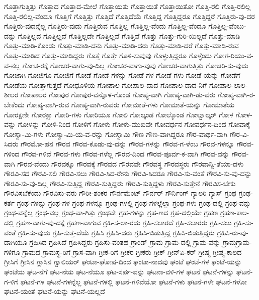 {ಗೊತ್ತಾಗುತ್ತಿತ್ತು
ಗೊತ್ತಾದ
ಗೊತ್ತಾದ-ಮೇಲೆ
ಗೊತ್ತಾಯಿತು
ಗೊತ್ತಾಯಿತೆ
ಗೊತ್ತಾಯಿತೋ
ಗೊತ್ತಿ-ರಲಿ
ಗೊತ್ತಿ-ರಲಿಲ್ಲ
ಗೊತ್ತಿ-ರಲಿಲ್ಲ-ವೆಂದೂ
ಗೊತ್ತಿಗೆ
ಗೊತ್ತಿತ್ತು
ಗೊತ್ತಿದೆ
ಗೊತ್ತಿದೆಯೆ
ಗೊತ್ತಿದ್ದ
ಗೊತ್ತಿದ್ದರೂ
ಗೊತ್ತಿದ್ದರೆ
ಗೊತ್ತಿರು-ವು-ದರ
ಗೊತ್ತಿರು-ವುದನ್ನೆಲ್ಲ
ಗೊತ್ತಿರು-ವುದು
ಗೊತ್ತಿರುವ
ಗೊತ್ತಿಲ್ಲ
ಗೊತ್ತಿಲ್ಲ-ವೆಂದು
ಗೊತ್ತಿಲ್ಲ-ವೆಂದೂ
ಗೊತ್ತಿಲ್ಲ-ವೆಂಬು-ದನ್ನು
ಗೊತ್ತಿಲ್ಲದ
ಗೊತ್ತಿಲ್ಲದೆ
ಗೊತ್ತಿಲ್ಲದೇ
ಗೊತ್ತಿಲ್ಲವೆ
ಗೊತ್ತಿವೆ
ಗೊತ್ತು
ಗೊತ್ತು-ಗುರಿ-ಯಿಲ್ಲದೆ
ಗೊತ್ತು-ಮಾಡಿ
ಗೊತ್ತು-ಮಾಡಿ-ಕೊಂಡು
ಗೊತ್ತು-ಮಾಡಿ-ದನು
ಗೊತ್ತು-ಮಾಡಿ-ದರು
ಗೊತ್ತು-ಮಾಡಿ-ದರೆ
ಗೊತ್ತು-ಮಾಡಿ-ರುವ
ಗೊತ್ತು-ಮಾಡಿದ
ಗೊತ್ತು-ಮಾಡಿದ್ದರು
ಗೊತ್ತೆ
ಗೊತ್ತೇ
ಗೊಳಿ-ಸುವುವು
ಗೊಳ್ಳುತ್ತಿದ್ದರೂ
ಗೊಳ್ಳೆಂದು
ಗೋಗ-ರಿಯು-ವ-ವ-ನಲ್ಲ
ಗೋಚ-ರಕ್ಕೆ
ಗೋಚರ-ವಾಗು-ವು-ದಿಲ್ಲ
ಗೋಚರ-ವಾಗು-ವುವು
ಗೋಚರ-ವಾಗುತ್ತಿತ್ತು
ಗೋಚರಿ-ಸು-ವುದು
ಗೋಜಾಗಿ
ಗೋಜಿಗೂ
ಗೋಜಿಗೆ
ಗೋಡೆ
ಗೋಡೆ-ಗಳನ್ನು
ಗೋಡೆ-ಗಳ
ಗೋಡೆ-ಗಳು
ಗೋಡೆ-ಯನ್ನು
ಗೋಡೆಗೆ
ಗೋಡೆಯ
ಗೋತ್ತಾಗುತ್ತದೆ
ಗೋಧೂಳಿಯ
ಗೋಪಾಲ
ಗೋಪಾಲ-ದಾದ
ಗೋಪಾಲ-ದಾದ-ನಿಗೆ
ಗೋಪಾಲ-ಲಾಲ-ಶೀಲರ
ಗೋಪಾಲರ
ಗೋಪುರ
ಗೋಪುರ-ವನ್ನೊಳ-ಗೊಂಡ
ಗೋಪ್ಯ-ವಾಗಿ
ಗೋಪ್ಯ-ವಾಗಿ-ಡು-ವರು
ಗೋಪ್ಯ-ವಾಗಿ-ರ-ಬೇಕೆಂದು
ಗೋಪ್ಯ-ವಾಗಿ-ರುವ
ಗೋಪ್ಯ-ವಾಗಿ-ರುವರು
ಗೋಮಾತೆ-ಗಳು
ಗೋಮಾತೆ-ಯನ್ನು
ಗೋಮಾತೆಯ
ಗೋರಕ್ಷಣೀ
ಗೋರಕ್ಷಾ
ಗೋರಿ-ಗಳು
ಗೋರಿಯೂ
ಗೋಲಿ
ಗೋಲ್ಕಂಡ
ಗೋಲ್ಕೊಂಡ
ಗೋಲ್ವಾಲ್ಕರ್
ಗೋಳ
ಗೋಳ-ವನ್ನು
ಗೋಳನ್ನು
ಗೋಳಿ-ನಿಂದ
ಗೋಳಿಗೆ
ಗೋಳು
ಗೋಳು-ಮುಖವೇ
ಗೋವರ್ಧನ
ಗೋವರ್ಧನ-ದಿಂದ
ಗೋವಾಕ್ಕೆ
ಗೋಸ್ವಾ-ಮಿ-ಗಳು
ಗೋಸ್ವಾ-ಮಿ-ಯ-ವ-ರನ್ನು
ಗೋಸ್ವಾಮಿ
ಗೌಣ
ಗೌಣ-ವಾಗಿದ್ದರೂ
ಗೌರ-ವಾರ್ಥ-ವಾಗಿ
ಗೌರ-ವಿ-ಸಿದರು
ಗೌರಮೋ-ಹನ
ಗೌರವ
ಗೌರವ-ಕೊಡು-ವು-ದನ್ನು
ಗೌರವ-ಗಳನ್ನು
ಗೌರವ-ಗ-ಳೆಂಬ
ಗೌರವ-ಗಳನ್ನೂ
ಗೌರವ-ಗಳಿಂದ
ಗೌರವ-ಗಳಿವೆ
ಗೌರವ-ಗಳು
ಗೌರವ-ಗಳೆಲ್ಲ
ಗೌರವ-ದಿಂದ
ಗೌರವ-ಪೂರ್ವ-ಕ-ವಾಗಿ
ಗೌರವ-ವನ್ನು
ಗೌರವ-ವಾಗಿ
ಗೌರವ-ವೆಂದು
ಗೌರವಕ್ಕೂ
ಗೌರವಕ್ಕೆ
ಗೌರವದ
ಗೌರವವೇ
ಗೌರವಸ್ಥ
ಗೌರವಸ್ಥರು
ಗೌರವಾನ್ವಿ-ತೆಯಾ-ದಳು
ಗೌರವಿ-ಸದ
ಗೌರವಿ-ಸಲಿ
ಗೌರವಿ-ಸಲು
ಗೌರವಿ-ಸಿದ-ರೇನು
ಗೌರವಿ-ಸಿದರೂ
ಗೌರವಿ-ಸು-ವಂತೆ
ಗೌರವಿ-ಸು-ವು-ದನ್ನು
ಗೌರವಿ-ಸು-ವು-ದಿಲ್ಲ
ಗೌರವಿ-ಸುತ್ತಿದ್ದ
ಗೌರವಿ-ಸುತ್ತಿದ್ದರು
ಗೌರವಿ-ಸುತ್ತಿದ್ದಳು
ಗೌರವಿ-ಸುತ್ತೇನೆ
ಗೌರವಿಸ-ಬೇಕು
ಗೌರವಿಸಬೆಕೆಂದು
ಗೌರವಿಸು-ವರು
ಗೌರೀ-ಶಂಕರ
ಗೌರ್ನಮೆಂಟ್
ಗೌರ್ನರ್
ಗೌರ್ನಿಂಗ್
ಗ್ಯಾಲರಿ
ಗ್ಯಾಸ್
ಗ್ರಂಥ
ಗ್ರಂಥ-ಕರ್ತ
ಗ್ರಂಥ-ಗಳನ್ನು
ಗ್ರಂಥ-ಗಳ
ಗ್ರಂಥ-ಗಳನ್ನೂ
ಗ್ರಂಥ-ಗಳಲ್ಲಿ
ಗ್ರಂಥ-ಗಳಲ್ಲೆಲ್ಲಾ
ಗ್ರಂಥ-ಗಳು
ಗ್ರಂಥ-ದಲ್ಲಿ
ಗ್ರಂಥ-ವನ್ನು
ಗ್ರಂಥ-ವನ್ನೆಲ್ಲ
ಗ್ರಂಥ-ವಲ್ಲ
ಗ್ರಂಥ-ವಾ-ಗಿತ್ತು
ಗ್ರಂಥವೇ
ಗ್ರಹ-ಗಳನ್ನು
ಗ್ರಹ-ಣದ
ಗ್ರಹ-ದಲ್ಲಿಯೇ
ಗ್ರಹಣ
ಗ್ರಹಣ-ಕಾಲ-ದಲ್ಲಿ
ಗ್ರಹಣ-ವಾಗು-ವು-ದಕ್ಕೆ
ಗ್ರಹಣ-ವಾಗುವ
ಗ್ರಹಿ-ಸ-ಲಾ-ರದು
ಗ್ರಹಿ-ಸಲಾರದೆ
ಗ್ರಹಿ-ಸಲಾರರು
ಗ್ರಹಿ-ಸಲು
ಗ್ರಹಿ-ಸು-ವಂತೆ
ಗ್ರಹಿ-ಸು-ವುದು
ಗ್ರಹಿ-ಸುತ್ತ-ದೆಯೆ
ಗ್ರಹಿಸಿ
ಗ್ರಹಿಸಿ-ದರು
ಗ್ರಹಿಸಿ-ಬಿಡುತ್ತಿದ್ದ
ಗ್ರಹಿಸಿ-ಬಿಡುತ್ತಿದ್ದರು
ಗ್ರಹಿಸಿ-ರು-ವು-ದಾಗಿಯೂ
ಗ್ರಹಿಸಿದ
ಗ್ರಹಿಸಿದೆ
ಗ್ರಹಿಸಿದ್ದರು
ಗ್ರಹಿಸು-ವಂತಹ
ಗ್ರಾಂಡ್
ಗ್ರಾಮ
ಗ್ರಾಮ-ದಲ್ಲಿ
ಗ್ರಾಮ-ವನ್ನು
ಗ್ರಾಮಗ್ರಾಮ-ಗಳಿಗೂ
ಗ್ರಾಮದ
ಗ್ರಾಮಸ್ಥ-ರಿಗೆ
ಗ್ರಾಸ-ವಾಗಿ
ಗ್ರೀಕ-ರಿಗೆ
ಗ್ರೀಕರ
ಗ್ರೀಕರು
ಗ್ರೀಕ್
ಗ್ರೀನ್ಏ-ಕರ್
ಗ್ರೀಷ್ಮ
ಗ್ರೀಷ್ಮ-ಕಾಲದ
ಗ್ರೀಸಿಗೆ
ಗ್ರೀಸಿನ
ಗ್ಲಾಸಿನ
ಗ್ವಾಲಿಯರ್
ಘಂಟಾ-ಘೋಷ-ದಿಂದ
ಘಂಟಾ-ನಾದವು
ಘಂಟೆ
ಘಂಟೆ-ಗಳ
ಘಂಟೆ-ಯನ್ನು
ಘಂಟೆಯ
ಘಟ-ನೆಗೆ
ಘಟ-ನೆಯ
ಘಟ-ನೆಯೂ
ಘಟ-ಸರ್ಪ-ವನ್ನು
ಘಟನಾ-ವಳಿ-ಗಳ
ಘಟನೆ
ಘಟನೆ-ಗಳನ್ನು
ಘಟನೆ-ಗ-ಳಿಗೆ
ಘಟನೆ-ಗಳ
ಘಟನೆ-ಗಳನ್ನೆಲ್ಲ
ಘಟನೆ-ಗಳಲ್ಲಿ
ಘಟನೆ-ಗಳಿವೆಯೋ
ಘಟನೆ-ಗಳು
ಘಟನೆ-ಗಳೇ
ಘಟನೆ-ಗಳೋ
ಘಟನೆ-ಯಂತೆ
ಘಟನೆ-ಯನ್ನು
ಘಟನೆ-ಯಲ್ಲದೆ
}
